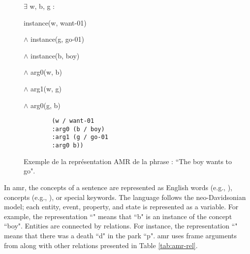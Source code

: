\documentclass{KBook}
\begin{document}
\begin{figure}[ht]
	\centering
	\begin{minipage}{.3\textwidth}
		
		\footnotesize
		$ \exists $ w, b, g : 
		
		instance(w, want-01) 
		
		$ \wedge $ instance(g, go-01) 
		
		$ \wedge $ instance(b, boy) 
		
		$ \wedge $ arg0(w, b) 
		
		$ \wedge $ arg1(w, g) 
		
		$ \wedge $ arg0(g, b)
	\end{minipage}
	\begin{minipage}{.35\textwidth}
		
		\begin{verbatim}
		(w / want-01
		:arg0 (b / boy)
		:arg1 (g / go-01
		:arg0 b))
		\end{verbatim}
		
	\end{minipage}
	\begin{minipage}{.3\textwidth}
		
	\end{minipage}
	\caption[Exemple d'une représentation AMR.]{Exemple de la représentation AMR de la phrase : ``The boy wants to go".}
	\label{fig:amr-exp}
\end{figure}

In \ac{amr}, the concepts of a sentence are represented as English words (e.g., ),  concepts (e.g., ), or special keywords. The language follows the neo-Davidsonian model; each entity, event, property, and state is represented as a variable. For example, the representation ``" means that ``b" is an instance of the concept ``boy". Entities are connected by relations. For instance, the representation ``" means that there was a death ``d" in the park ``p". \ac{amr} uses frame arguments from  along with other relations presented in Table \ref{tab:amr-rel}.
\end{document}
